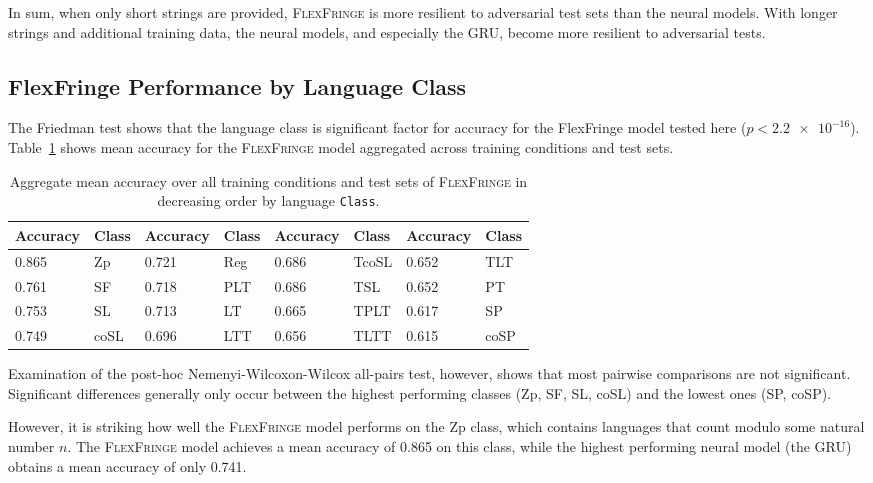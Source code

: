 \documentclass[twoside,11pt]{article}
\newcommand{\ttt}[1]{\texttt{#1}}
\newcommand{\tttx}[1]{\ttt{#1}\xspace}
\newcommand{\Class}{\tttx{Class}}
\begin{document}
In sum, when only short strings are provided, \textsc{FlexFringe} is more
resilient to adversarial test sets than the neural models. 
With longer strings and additional training data, the neural models, and especially the GRU, become more resilient to adversarial tests.

\subsection{FlexFringe Performance by Language Class} \label{sec:res-class}

The Friedman test shows that the language class is significant factor
for accuracy for the FlexFringe model tested here
(\(p < \num{2.2e-16}\)). 
Table~\ref{tab:ff-acc-lang} shows mean
accuracy for the \textsc{FlexFringe} model aggregated across training conditions and test sets.

\begin{table}[t]
  \centering
  \begin{tabular}{ll|ll|ll|ll}
    \toprule
    Accuracy & Class & Accuracy & Class & Accuracy & Class & Accuracy & Class \\
    \midrule
    0.865    & Zp    & 0.721    & Reg   & 0.686    & TcoSL & 0.652    & TLT   \\
    0.761    & SF    & 0.718    & PLT   & 0.686    & TSL   & 0.652    & PT    \\
    0.753    & SL    & 0.713    & LT    & 0.665    & TPLT  & 0.617    & SP    \\
    0.749    & coSL  & 0.696    & LTT   & 0.656    & TLTT  & 0.615    & coSP  \\
    \bottomrule
  \end{tabular}
  \caption{Aggregate mean accuracy over all training conditions and
    test sets of \textsc{FlexFringe} in decreasing order by language \Class.}
  \label{tab:ff-acc-lang}
\end{table}

Examination of the post-hoc Nemenyi-Wilcoxon-Wilcox all-pairs test,
however, shows that most pairwise comparisons are not
significant. Significant differences generally only occur between the
highest performing classes (Zp, SF, SL, coSL) and the lowest ones (SP,
coSP).

However, it is striking how well the \textsc{FlexFringe} model performs on the Zp class, which contains languages that count modulo some natural number \(n\). 
The \textsc{FlexFringe} model achieves a mean accuracy of 0.865 on this class, while the highest performing neural model (the GRU) obtains a mean accuracy of only 0.741.
\end{document}
